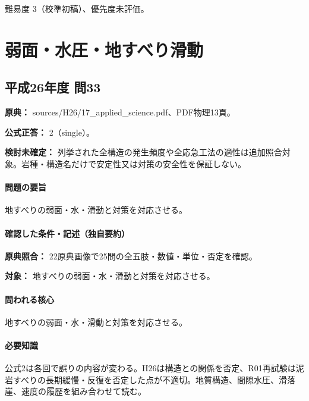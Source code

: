 \par 難易度 3（校準初稿）、優先度未評価。

\section{弱面・水圧・地すべり滑動}

\subsection{平成26年度 問33}
\label{q:h26-reg-applied-33}

\noindent\textbf{原典：} sources/H26/17\_applied\_science.pdf、PDF物理13頁。

\textbf{公式正答：} 2（single）。

\par\textbf{検討未確定：} 列挙された全構造の発生頻度や全応急工法の適性は追加照合対象。岩種・構造名だけで安定性又は対策の安全性を保証しない。

\paragraph{問題の要旨} 地すべりの弱面・水・滑動と対策を対応させる。

\paragraph{確認した条件・記述（独自要約）}\mbox{}\par

\noindent\textbf{原典照合：} 22原典画像で25問の全五肢・数値・単位・否定を確認。\par

\noindent\textbf{対象：} 地すべりの弱面・水・滑動と対策を対応させる。\par

\paragraph{問われる核心} 地すべりの弱面・水・滑動と対策を対応させる。

\paragraph{必要知識} 公式2は各回で誤りの内容が変わる。H26は構造との関係を否定、R01再試験は泥岩すべりの長期緩慢・反復を否定した点が不適切。地質構造、間隙水圧、滑落崖、速度の履歴を組み合わせて読む。

